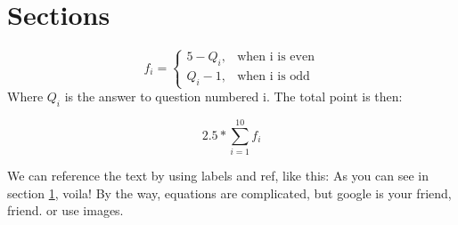 \section{Sections} \label{sec:sus}

\begin{equation} \label{eq:convert}
	    f_{i} = 
	\begin{cases} 
	    5 - Q_{i}, & \text{when i is even}\\
	    Q_{i} - 1, & \text{when i is odd}
	\end{cases}
\end{equation}
Where \(Q_{i} \) is the answer to question numbered i. The total point is then: 

\begin{equation} \label{eq:sum}
	2.5 * \displaystyle \sum_{i=1}^{10} f_{i} 
\end{equation}


We can reference the text by using labels and ref, like this:
As you can see in section \ref{sec:sus}, voila!
By the way, equations are complicated, but google is your friend, friend. or use images.